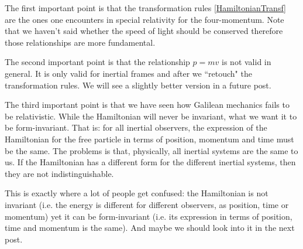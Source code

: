 \documentclass[aps,pra,10pt,floatfix,nofootinbib]{revtex4-1}
\theoremstyle{definition}
\begin{document}
The first important point is that the transformation rules \eqref{HamiltonianTransf} are the ones one encounters in special relativity for the four-momentum. Note that we haven't said whether the speed of light should be conserved therefore those relationships are more fundamental.

The second important point is that the relationship $p=mv$ is not valid in general. It is only valid for inertial frames and after we ``retouch" the transformation rules. We will see a slightly better version in a future post.

The third important point is that we have seen how Galilean mechanics fails to be relativistic. While the Hamiltonian will never be invariant, what we want it to be form-invariant. That is: for all inertial observers, the expression of the Hamiltonian for the free particle in terms of position, momentum and time must be the same. The problems is that, physically, all inertial systems are the same to us. If the Hamiltonian has a different form for the different inertial systems, then they are not indistinguishable.

This is exactly where a lot of people get confused: the Hamiltonian is not invariant (i.e. the energy is different for different observers, as position, time or momentum) yet it can be form-invariant (i.e. its expression in terms of position, time and momentum is the same). And maybe we should look into it in the next post.
\end{document}
